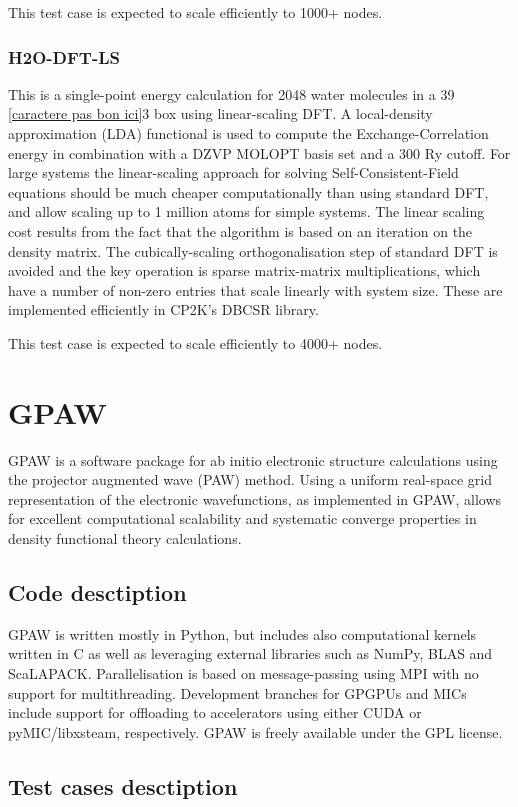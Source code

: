 This test case is expected to scale efficiently to 1000+ nodes.

\subsubsection{H2O-DFT-LS}
This is a single-point energy calculation for 2048 water molecules in a 39 \ref{caractere pas bon ici}3 box using linear-scaling DFT. A local-density approximation (LDA) functional is used to compute the Exchange-Correlation energy in combination with a DZVP MOLOPT basis set and a 300 Ry cutoff. For large systems the linear-scaling approach for solving Self-Consistent-Field equations should be much cheaper computationally than using standard DFT, and allow scaling up to 1 million atoms for simple systems. The linear scaling cost results from the fact that the algorithm is based on an iteration on the density matrix. The cubically-scaling orthogonalisation step of standard DFT is avoided and the key operation is sparse matrix-matrix multiplications, which have a number of non-zero entries that scale linearly with system size. These are implemented efficiently in CP2K's DBCSR library.

This test case is expected to scale efficiently to 4000+ nodes.

\section{GPAW}
GPAW is a software package for ab initio electronic structure calculations using the projector augmented wave (PAW) method. Using a uniform real-space grid representation of the electronic wavefunctions, as implemented in GPAW, allows for excellent computational scalability and systematic converge properties in density functional theory calculations.

\subsection{Code desctiption}
GPAW is written mostly in Python, but includes also computational kernels written in C as well as leveraging external libraries such as NumPy, BLAS and ScaLAPACK. Parallelisation is based on message-passing using MPI with no support for multithreading. Development branches for GPGPUs and MICs include support for offloading to accelerators using either CUDA or pyMIC/libxsteam, respectively. GPAW is freely available under the GPL license.

\subsection{Test cases desctiption}
